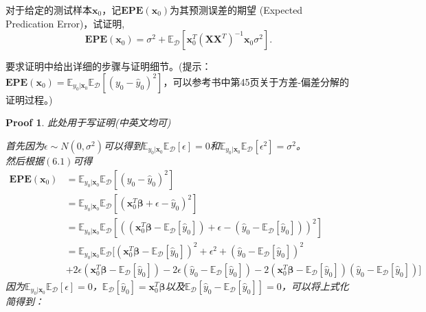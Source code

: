 \documentclass[a4paper,UTF8]{article}
\numberwithin{equation}{section}
\newtheorem*{myProof}{Proof}
\begin{document}
对于给定的测试样本$\textbf{x}_0$，记$\mathbf{EPE}(\textbf{x}_0)$为其预测误差的期望 (Expected Predication Error)，试证明,
\[
	\mathbf{EPE}(\textbf{x}_0) = \sigma^2+\mathbb{E}_{\mathcal{D}}[\textbf{x}_0^T(\textbf{X}\textbf{X}^T)^{-1}\textbf{x}_0\sigma^2].
\]

要求证明中给出详细的步骤与证明细节。(提示：$\mathbf{EPE}(\textbf{x}_0)=\mathbb{E}_{y_0|\textbf{x}_0} \mathbb{E}_{\mathcal{D}}[(y_0-\hat{y}_0)^2]$，可以参考书中第45页关于方差-偏差分解的证明过程。)

\begin{myProof}
此处用于写证明(中英文均可)

首先因为$\epsilon\sim N(0,\sigma^2)$可以得到$\mathbb{E}_{y_0|\textbf{x}_0}\mathbb{E}_{\mathcal{D}}[\epsilon] = 0$和$\mathbb{E}_{y_0|\textbf{x}_0}\mathbb{E}_{\mathcal{D}}[\epsilon^2] = \sigma^2$。\\
然后根据$(6.1)$可得
\begin{equation}
\begin{aligned}
\mathbf{EPE}(\textbf{x}_0)
&=\mathbb{E}_{y_0|\textbf{x}_0}\mathbb{E}_{\mathcal{D}}[(y_0-\hat{y}_0)^2]\\
&=\mathbb{E}_{y_0|\textbf{x}_0}\mathbb{E}_{\mathcal{D}}[(\textbf{x}_0^T \bm\beta +\epsilon-\hat{y}_0)^2]\\
&=\mathbb{E}_{y_0|\textbf{x}_0}\mathbb{E}_{\mathcal{D}}[((\textbf{x}_0^T \bm\beta - \mathbb{E}_{\mathcal{D}}[\hat{y}_0]) +\epsilon-(\hat{y}_0 - \mathbb{E}_{\mathcal{D}}[\hat{y}_0] ))^2]\\
&=\mathbb{E}_{y_0|\textbf{x}_0}\mathbb{E}_{\mathcal{D}}[(\textbf{x}_0^T \bm\beta - \mathbb{E}_{\mathcal{D}}[\hat{y}_0])^2 +\epsilon^2+(\hat{y}_0 - \mathbb{E}_{\mathcal{D}}[\hat{y}_0])^2\\
&+ 2\epsilon(\textbf{x}_0^T \bm\beta - \mathbb{E}_{\mathcal{D}}[\hat{y}_0])-2\epsilon(\hat{y}_0 - \mathbb{E}_{\mathcal{D}}[\hat{y}_0]) - 2(\textbf{x}_0^T \bm\beta - \mathbb{E}_{\mathcal{D}}[\hat{y}_0])(\hat{y}_0 - \mathbb{E}_{\mathcal{D}}[\hat{y}_0])]
\end{aligned}
\end{equation}
因为$\mathbb{E}_{y_0|\textbf{x}_0}\mathbb{E}_{\mathcal{D}}[\epsilon] = 0$，$\mathbb{E}_{\mathcal{D}}[\hat{y}_0] = \textbf{x}_0^T \bm\beta$以及$\mathbb{E}_{\mathcal{D}}[\hat{y}_0 - \mathbb{E}_{\mathcal{D}}[\hat{y}_0]] = 0$，可以将上式化简得到：


\end{myProof}
\end{document}
